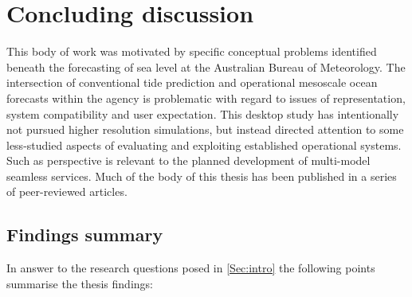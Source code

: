 
\chapter{Concluding discussion}\label{c:conclusions}

This body of work was motivated by specific conceptual problems identified beneath the forecasting of sea level at the Australian Bureau of Meteorology.  The intersection of conventional tide prediction and operational mesoscale ocean forecasts within the agency is problematic with regard to issues of representation, system compatibility and user expectation.
This desktop study has intentionally not pursued higher resolution simulations, but instead directed attention to some less-studied aspects of evaluating and exploiting established operational systems.   Such as perspective is relevant to the planned development of multi-model seamless services.   
Much of the body of this thesis has been published in a series of peer-reviewed articles.
\section{Findings summary}
In answer to the research questions posed in \ref{Sec:intro} the following points summarise the thesis findings:

